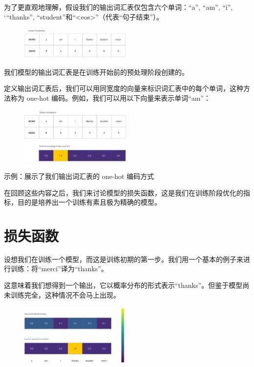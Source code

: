 \documentclass[cn,hazy,blue,10pt,normal]{elegantnote}
\begin{document}
为了更直观地理解，假设我们的输出词汇表仅包含六个单词：“a”, “am”, “i”, `“thanks”, “student”和“<eos>”（代表“句子结束”）。

\begin{figure}[ht]
	\centering
	\includegraphics[width=0.5\textwidth]{image/vocabulary.png}
\end{figure}

我们模型的输出词汇表是在训练开始前的预处理阶段创建的。

定义输出词汇表后，我们可以用同宽度的向量来标识词汇表中的每个单词，这种方法称为 one-hot 编码。例如，我们可以用以下向量来表示单词“am”：
\begin{figure}[ht]
	\centering
	\includegraphics[width=0.5\textwidth]{image/one-hot-vocabulary-example.png}
\end{figure}

示例：展示了我们输出词汇表的 one-hot 编码方式

在回顾这些内容之后，我们来讨论模型的损失函数，这是我们在训练阶段优化的指标，目的是培养出一个训练有素且极为精确的模型。

\section{损失函数}

设想我们在训练一个模型，而这是训练初期的第一步。我们用一个基本的例子来进行训练：将“merci”译为“thanks”。

这意味着我们想得到一个输出，它以概率分布的形式表示“thanks”。但鉴于模型尚未训练完全，这种情况不会马上出现。
\begin{figure}[ht]
    \centering
    \includegraphics[width=0.5\textwidth]{image/transformer_logits_output_and_label.png}
\end{figure}
\end{document}
